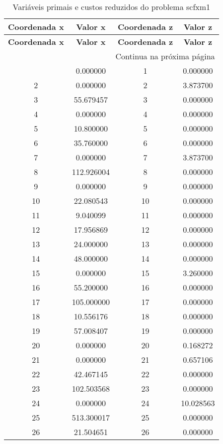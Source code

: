 \documentclass[12pt]{article}
\begin{document}
\begin{longtable}{@{}cccc@{}}
\caption{Variáveis primais e custos reduzidos do problema scfxm1} \\
\toprule
\textbf{Coordenada x} & \textbf{Valor x} & \textbf{Coordenada z} & \textbf{Valor z} \\
\midrule
\endfirsthead

\toprule
\textbf{Coordenada x} & \textbf{Valor x} & \textbf{Coordenada z} & \textbf{Valor z} \\
\midrule
\endhead

\midrule \multicolumn{4}{r}{{Continua na próxima página}} \\ \midrule
\endfoot

\bottomrule
\endlastfoot
1 & 0.000000 & 1 & 0.000000 \\
2 & 0.000000 & 2 & 3.873700 \\
3 & 55.679457 & 3 & 0.000000 \\
4 & 0.000000 & 4 & 0.000000 \\
5 & 10.800000 & 5 & 0.000000 \\
6 & 35.760000 & 6 & 0.000000 \\
7 & 0.000000 & 7 & 3.873700 \\
8 & 112.926004 & 8 & 0.000000 \\
9 & 0.000000 & 9 & 0.000000 \\
10 & 22.080543 & 10 & 0.000000 \\
11 & 9.040099 & 11 & 0.000000 \\
12 & 17.956869 & 12 & 0.000000 \\
13 & 24.000000 & 13 & 0.000000 \\
14 & 48.000000 & 14 & 0.000000 \\
15 & 0.000000 & 15 & 3.260000 \\
16 & 55.200000 & 16 & 0.000000 \\
17 & 105.000000 & 17 & 0.000000 \\
18 & 10.556176 & 18 & 0.000000 \\
19 & 57.008407 & 19 & 0.000000 \\
20 & 0.000000 & 20 & 0.168272 \\
21 & 0.000000 & 21 & 0.657106 \\
22 & 42.467145 & 22 & 0.000000 \\
23 & 102.503568 & 23 & 0.000000 \\
24 & 0.000000 & 24 & 10.028563 \\
25 & 513.300017 & 25 & 0.000000 \\
26 & 21.504651 & 26 & 0.000000 \\

\end{longtable}
\end{document}
